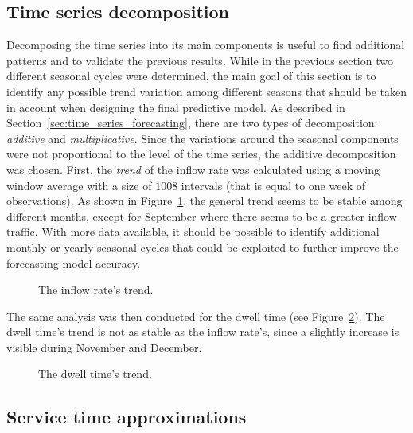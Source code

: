 \subsection{Time series decomposition}
\label{subsec:time_series_decomposition}

Decomposing the time series into its main components is useful to find additional patterns and to validate the previous results. While in the previous section two different seasonal cycles were determined, the main goal of this section is to identify any possible trend variation among different seasons that should be taken in account when designing the final predictive model. As described in Section~\ref{sec:time_series_forecasting}, there are two types of decomposition: \emph{additive} and \emph{multiplicative}. Since the variations around the seasonal components were not proportional to the level of the time series, the additive decomposition was chosen.
First, the \emph{trend} of the inflow rate was calculated using a moving window average with a size of \( 1008 \) intervals (that is equal to one week of observations). As shown in Figure~\ref{fig:inflow_rate_trend}, the general trend seems to be stable among different months, except for September where there seems to be a greater inflow traffic. With more data available, it should be possible to identify additional monthly or yearly seasonal cycles that could be exploited to further improve the forecasting model accuracy.

\begin{figure}
  \begin{center}
  \end{center}
  \caption{The inflow rate's trend.}
  \label{fig:inflow_rate_trend}
\end{figure}

The same analysis was then conducted for the dwell time (see Figure~\ref{fig:dwell_time_trend}). The dwell time’s trend is not as stable as the inflow rate’s, since a slightly increase is visible during November and December.

\begin{figure}
  \begin{center}
  \end{center}
  \caption{The dwell time's trend.}
  \label{fig:dwell_time_trend}
\end{figure}

\subsection{Service time approximations}
\label{subsec:service_time_approximations}


